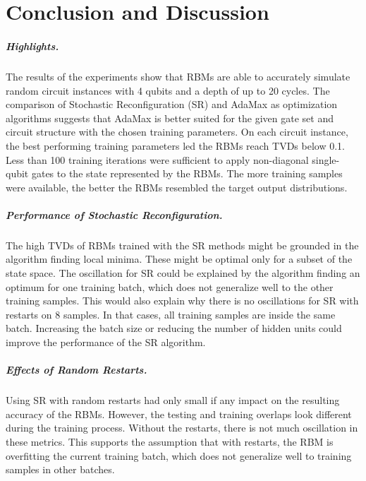 \chapter{Conclusion and Discussion}
\label{sec:discussion}

\paragraph{Highlights.}
The results of the experiments show that RBMs are able to accurately simulate random circuit 
instances with 4 qubits and a depth of up to 20 cycles. The comparison of 
Stochastic Reconfiguration (SR) and AdaMax as optimization algorithms suggests that 
AdaMax is better suited for the given gate set and circuit structure with the chosen training 
parameters. On each circuit instance, the best performing training parameters led 
the RBMs reach TVDs below 0.1. Less than 100 training iterations were sufficient to 
apply non-diagonal single-qubit gates to the state represented by the RBMs. 
The more training samples were available, the better the RBMs resembled the target output distributions.

\paragraph{Performance of Stochastic Reconfiguration.}
The high TVDs of RBMs trained with the SR methods might be grounded in the algorithm finding 
local minima. These might be optimal only for a subset of the state space. The oscillation for SR could be explained by the algorithm finding an 
optimum for one training batch, which does not generalize well to the other training samples.
This would also explain why there is no oscillations for SR with restarts on 8 samples. In that
cases, all training samples are inside the same batch. Increasing the batch size or reducing the 
number of hidden units could improve the performance of the SR algorithm.

\paragraph{Effects of Random Restarts.}
Using SR with random restarts had only small if any 
impact on the resulting accuracy of the RBMs. However, the testing and training overlaps 
look different during the training process. Without the restarts, there is not much 
oscillation in these metrics. This supports the assumption that with restarts, the 
RBM is overfitting the current training batch, which does not generalize well to training 
samples in other batches. 

